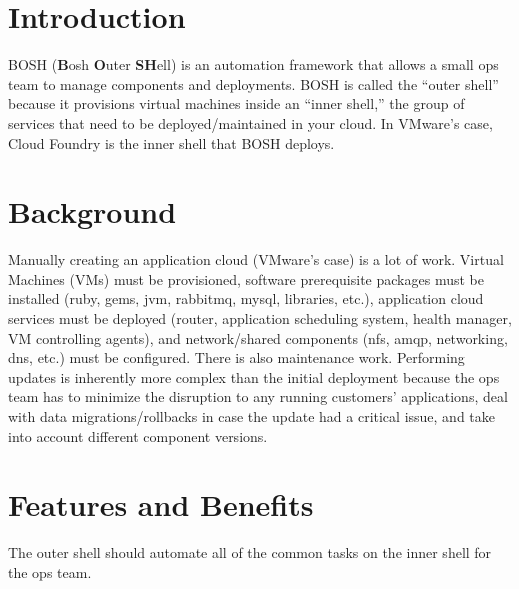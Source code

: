
\def\mytitle{BOSH Technical Overview}
\def\myauthor{VMware 2012 - Cloud Foundry}
\def\latexmode{memoir}

\chapter{Introduction}
\label{introduction}

BOSH (\textbf{B}osh \textbf{O}uter \textbf{SH}ell) is an automation framework that allows a small ops team to manage components and deployments. BOSH is called the ``outer shell'' because it provisions virtual machines inside an ``inner shell,'' the group of services that need to be deployed\slash maintained in your cloud. In VMware’s case, Cloud Foundry is the inner shell that BOSH deploys.

\chapter{Background}
\label{background}

Manually creating an application cloud (VMware’s case) is a lot of work. Virtual Machines (VMs) must be provisioned, software prerequisite packages must be installed (ruby, gems, jvm, rabbitmq, mysql, libraries, etc.), application cloud services must be deployed (router, application scheduling system, health manager, VM controlling agents), and network\slash shared components (nfs, amqp, networking, dns, etc.) must be configured. There is also maintenance work. Performing updates is inherently more complex than the initial deployment because the ops team has to minimize the disruption to any running customers’ applications, deal with data migrations\slash rollbacks in case the update had a critical issue, and take into account different component versions.

\chapter{Features and Benefits}
\label{featuresandbenefits}

The outer shell should automate all of the common tasks on the inner shell for the ops team.

